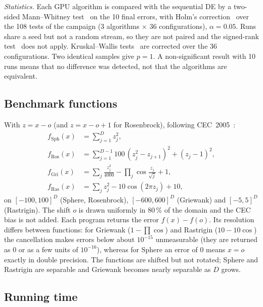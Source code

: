 \documentclass[conference]{IEEEtran}
\begin{document}
\emph{Statistics.} Each GPU algorithm is compared with the sequential DE by a two-sided
Mann--Whitney test~\cite{mann1947} on the 10 final errors, with Holm's
correction~\cite{holm1979} over the 108 tests of the campaign (3 algorithms $\times$ 36
configurations), $\alpha=0.05$. Runs share a seed but not a random stream, so they are not
paired and the signed-rank test~\cite{wilcoxon1945} does not apply. Kruskal--Wallis
tests~\cite{kruskal1952} are corrected over the 36 configurations. Two identical samples give
$p=1$. A non-significant result with 10 runs means that no difference was detected, not that
the algorithms are equivalent.

\subsection{Benchmark functions}
With $z=x-o$ (and $z=x-o+1$ for Rosenbrock), following CEC~2005~\cite{suganthan2005}:
\begin{align*}
f_{\mathrm{Sph}}(x) &= \textstyle\sum_{j=1}^{D} z_j^2,\\
f_{\mathrm{Ros}}(x) &= \textstyle\sum_{j=1}^{D-1} 100\,(z_j^2-z_{j+1})^2+(z_j-1)^2,\\
f_{\mathrm{Gri}}(x) &= \textstyle\sum_{j} \frac{z_j^2}{4000} - \prod_{j}\cos\frac{z_j}{\sqrt{j}} + 1,\\
f_{\mathrm{Ras}}(x) &= \textstyle\sum_{j} z_j^2 - 10\cos(2\pi z_j) + 10,
\end{align*}
on $[-100,100]^D$ (Sphere, Rosenbrock), $[-600,600]^D$ (Griewank) and $[-5,5]^D$ (Rastrigin).
The shift $o$ is drawn uniformly in 80\,\% of the domain and the CEC bias is not added. Each
program returns the error $f(x)-f(o)$. Its resolution differs between functions: for Griewank
($1-\prod\cos$) and Rastrigin ($10-10\cos$) the cancellation makes errors below about
$10^{-15}$ unmeasurable (they are returned as 0 or as a few units of $10^{-16}$), whereas for Sphere an error of 0 means $x=o$ exactly in double precision.
The functions are shifted but not rotated; Sphere and Rastrigin are separable and Griewank
becomes nearly separable as $D$ grows.

\subsection{Running time}\label{sec:time}
\end{document}
